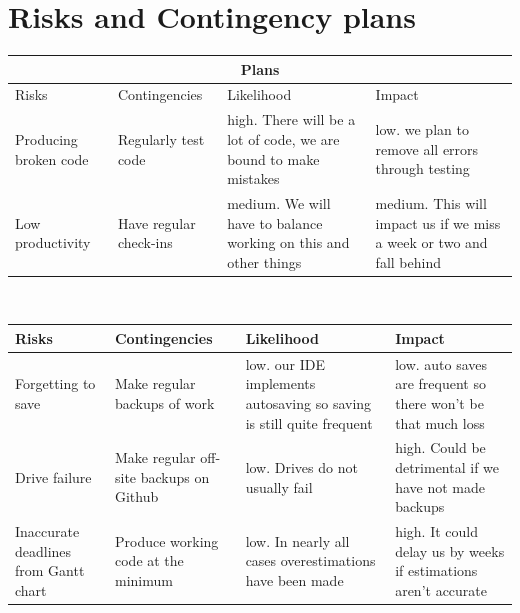 \documentclass{article}
\begin{document}
\section{Risks and Contingency plans} %
\begin{tabular}{|p{}|p{}|p{}|p{}|}
    \hline
    \multicolumn{4}{|c|}{Plans}\\
    \hline
    Risks & Contingencies & Likelihood & Impact\\
    \hline
    Producing broken code & Regularly test code & high. There will be a lot of code, we are bound to make mistakes & low. we plan to remove all errors through testing\\
    \hline
    Low productivity & Have regular check-ins & medium. We will have to balance working on this and other things & medium. This will impact us if we miss a week or two and fall behind\\
    \hline
\end{tabular}
\\
\begin{tabular}{|p{}|p{}|p{}|p{}|}
    \hline
    Risks & Contingencies & Likelihood & Impact\\
    \hline
    Forgetting to save & Make regular backups of work & low. our IDE implements autosaving so saving is still quite frequent & low. auto saves are frequent so there won't be that much loss\\
    \hline
    Drive failure & Make regular off-site backups on Github & low. Drives do not usually fail & high. Could be detrimental if we have not made backups\\
    \hline
    Inaccurate deadlines from Gantt chart & Produce working code at the minimum & low. In nearly all cases overestimations have been made & high. It could delay us by weeks if estimations aren't accurate\\
    \hline
\end{tabular}

\newpage %
%
%
\printbibliography
\end{document}
